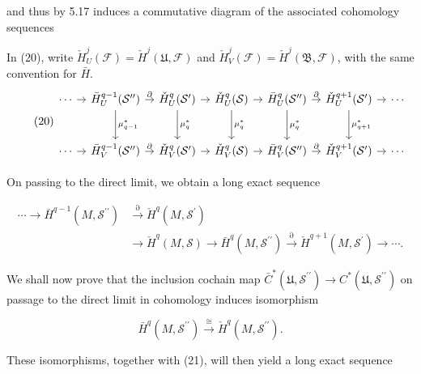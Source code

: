 and thus by 5.17 induces a commutative diagram of the associated cohomology sequences


In (20), write $\check H_U^j(\mathcal F)=\check H^j(\mathfrak U,\mathcal F)$
and $\check H_V^j(\mathcal F)=\check H^j(\mathfrak B,\mathcal F)$, with the same convention for $\bar H$.
\begin{equation}
\tag{20}\label{eq:5.33:20}
\begin{tikzcd}[ampersand replacement=\&,column sep=.8em,row sep=2.6em]
\cdots\arrow[r] \& \bar H_U^{q-1}(\mathcal S'')\arrow[r,"\partial"]\arrow[d,"\mu_{q-1}^*"] \&
\check H_U^q(\mathcal S')\arrow[r]\arrow[d,"\mu_q^*"] \&
\check H_U^q(\mathcal S)\arrow[r]\arrow[d,"\mu_q^*"] \&
\bar H_U^q(\mathcal S'')\arrow[r,"\partial"]\arrow[d,"\mu_q^*"] \&
\check H_U^{q+1}(\mathcal S')\arrow[r]\arrow[d,"\mu_{q+1}^*"] \&\cdots\\
\cdots\arrow[r] \& \bar H_V^{q-1}(\mathcal S'')\arrow[r,"\partial"] \&
\check H_V^q(\mathcal S')\arrow[r] \& \check H_V^q(\mathcal S)\arrow[r] \&
\bar H_V^q(\mathcal S'')\arrow[r,"\partial"] \&\check H_V^{q+1}(\mathcal S')\arrow[r] \& \cdots
\end{tikzcd}
\end{equation}

On passing to the direct limit, we obtain a long exact sequence

\begin{equation}
\tag{21}\label{eq:5.33:21}
\begin{aligned}\cdots\longrightarrow\bar{H}^{q-1}(M,\mathcal{S}^{\prime\prime})&\xrightarrow{\partial}\check{H}^{q}(M,\mathcal{S}^{\prime})\\&\longrightarrow\check{H}^{q}(M,\mathcal{S})\longrightarrow\bar{H}^{q}(M,\mathcal{S}^{\prime\prime})\xrightarrow{\partial}\check{H}^{q+1}(M,\mathcal{S}^{\prime})\longrightarrow\cdots.\end{aligned}
\end{equation}

We shall now prove that the inclusion cochain map  $\bar{C}^*(\mathfrak{U},\mathcal{S}^{\prime\prime}) \to C^*(\mathfrak{U},\mathcal{S}^{\prime\prime})$ on passage to the direct limit in cohomology induces isomorphism

\begin{equation}
\tag{22}\label{eq:5.33:22}
\bar{H}^{q}(M,\mathcal{S}^{\prime\prime})\xrightarrow{\cong}\check{H}^{q}(M,\mathcal{S}^{\prime\prime}).
\end{equation}

These isomorphisms, together with (21), will then yield a long exact sequence

